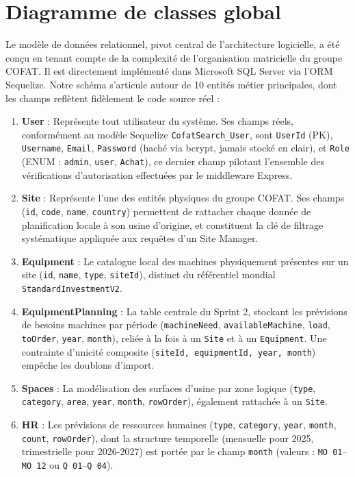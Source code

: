 \section{Diagramme de classes global}
Le modèle de données relationnel, pivot central de l'architecture logicielle, a été conçu en tenant compte de la complexité de l'organisation matricielle du groupe COFAT. Il est directement implémenté dans Microsoft SQL Server via l'ORM Sequelize. Notre schéma s'articule autour de 10 entités métier principales, dont les champs reflètent fidèlement le code source réel :

\begin{enumerate}
    \item \textbf{User} : Représente tout utilisateur du système. Ses champs réels, conformément au modèle Sequelize \texttt{CofatSearch\_User}, sont \texttt{UserId} (PK), \texttt{Username}, \texttt{Email}, \texttt{Password} (haché via bcrypt, jamais stocké en clair), et \texttt{Role} (ENUM : \texttt{admin}, \texttt{user}, \texttt{Achat}), ce dernier champ pilotant l'ensemble des vérifications d'autorisation effectuées par le middleware Express.
    \item \textbf{Site} : Représente l'une des entités physiques du groupe COFAT. Ses champs (\texttt{id}, \texttt{code}, \texttt{name}, \texttt{country}) permettent de rattacher chaque donnée de planification locale à son usine d'origine, et constituent la clé de filtrage systématique appliquée aux requêtes d'un Site Manager.
    \item \textbf{Equipment} : Le catalogue local des machines physiquement présentes sur un site (\texttt{id}, \texttt{name}, \texttt{type}, \texttt{siteId}), distinct du référentiel mondial \texttt{StandardInvestmentV2}.
    \item \textbf{EquipmentPlanning} : La table centrale du Sprint 2, stockant les prévisions de besoins machines par période (\texttt{machineNeed}, \texttt{availableMachine}, \texttt{load}, \texttt{toOrder}, \texttt{year}, \texttt{month}), reliée à la fois à un \texttt{Site} et à un \texttt{Equipment}. Une contrainte d'unicité composite (\texttt{siteId, equipmentId, year, month}) empêche les doublons d'import.
    \item \textbf{Spaces} : La modélisation des surfaces d'usine par zone logique (\texttt{type}, \texttt{category}, \texttt{area}, \texttt{year}, \texttt{month}, \texttt{rowOrder}), également rattachée à un \texttt{Site}.
    \item \textbf{HR} : Les prévisions de ressources humaines (\texttt{type}, \texttt{category}, \texttt{year}, \texttt{month}, \texttt{count}, \texttt{rowOrder}), dont la structure temporelle (mensuelle pour 2025, trimestrielle pour 2026-2027) est portée par le champ \texttt{month} (valeurs : \texttt{MO 01}--\texttt{MO 12} ou \texttt{Q 01}--\texttt{Q 04}).

\end{enumerate}
